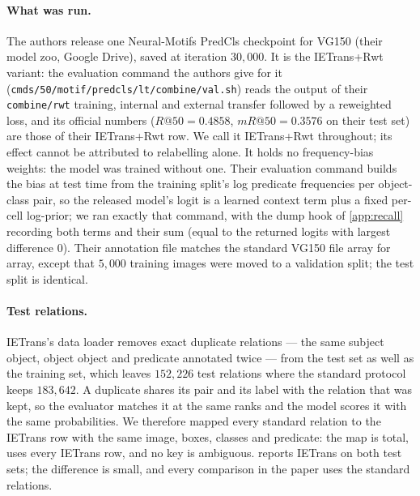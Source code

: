 \paragraph{What was run.} The authors release one Neural-Motifs PredCls checkpoint for
VG150 (their model zoo, Google Drive), saved at iteration $30{,}000$. It is the IETrans+Rwt variant: the evaluation command the
authors give for it (\texttt{cmds/50/motif/predcls/lt/combine/val.sh}) reads the output
of their \texttt{combine/rwt} training, internal and external transfer followed by a
reweighted loss, and its official numbers ($R@50=0.4858$, $mR@50=0.3576$ on their test set)
are those of their IETrans+Rwt row. We call it IETrans+Rwt throughout; its effect cannot be
attributed to relabelling alone. It holds no frequency-bias weights: the model was trained
without one. Their evaluation command builds
the bias at test time from the training split's log predicate frequencies per object-class
pair, so the released model's logit is a learned context term plus a fixed per-cell
log-prior; we ran exactly that command, with the dump hook of \cref{app:recall} recording
both terms and their sum (equal to the returned logits with largest difference $0$). Their
annotation file matches the standard VG150 file array for array, except that $5{,}000$
training images were moved to a validation split; the test split is identical.

\paragraph{Test relations.} IETrans's data loader removes exact duplicate relations --- the
same subject object, object object and predicate annotated twice --- from the test set as
well as the training set, which leaves $152{,}226$ test relations where the standard protocol
keeps $183{,}642$. A duplicate shares its pair and its label with the relation that was kept,
so the evaluator matches it at the same ranks and the model scores it with the same
probabilities. We therefore mapped every standard relation to the IETrans row with the same
image, boxes, classes and predicate: the map is total, uses every IETrans row, and no key is
ambiguous.  reports IETrans on both test sets; the difference is
small, and every comparison in the paper uses the standard relations.

\begin{table}[h]
\centering\footnotesize
\caption{The released IETrans checkpoint under the official recall rules, on its own test
relations and on the standard ones.}
\label{tab:ietrans-protocols}

\end{table}

